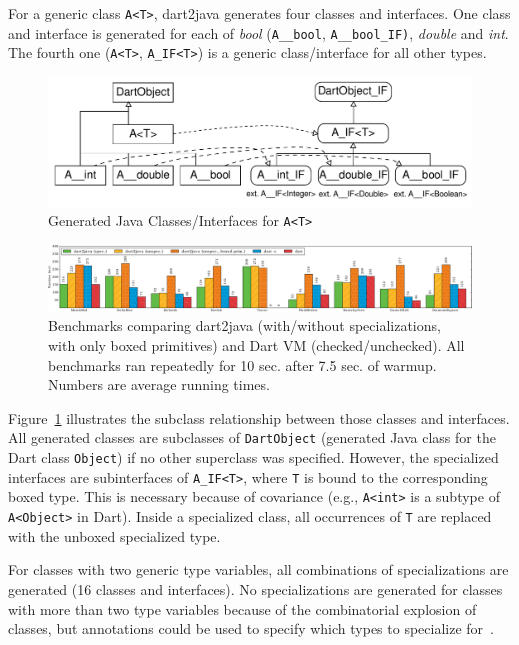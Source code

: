 \documentclass[sigplan]{acmart}
\begin{document}
For a generic class \texttt{A<T>}, dart2java generates four classes and interfaces. One class and interface is generated for each of \emph{bool} (\texttt{A\_\_bool}, \texttt{A\_\_bool\_IF)}, \emph{double} and \emph{int}. The fourth one (\texttt{A<T>},  \texttt{A\_IF<T>}) is a generic class/interface for all other types.

\begin{figure}[!htp]
	\includegraphics[width=\columnwidth]{generic_spec_classes.pdf}
    \caption{Generated Java Classes/Interfaces for \texttt{A<T>}}
    \label{fig:generic_spec_classes}
\end{figure}
\begin{figure}[!t]
\includegraphics[width=\textwidth]{benchmark_plot.pdf}
\caption{Benchmarks comparing dart2java (with/without specializations, with only boxed primitives) and Dart VM (checked/unchecked). All benchmarks ran repeatedly for 10 sec. after 7.5 sec. of warmup. Numbers are average running times.}
\label{fig:benchmarks}
\end{figure}

Figure~\ref{fig:generic_spec_classes} illustrates the subclass relationship between those classes and interfaces. All generated classes are subclasses of \texttt{DartObject} (generated Java class for the Dart class \texttt{Object}) if no other superclass was specified. However, the specialized interfaces are subinterfaces of \texttt{A\_IF<T>}, where \texttt{T} is bound to the corresponding boxed type. This is necessary because of covariance (e.g., \texttt{A<int>} is a subtype of \texttt{A<Object>} in Dart). Inside a specialized class, all occurrences of \texttt{T} are replaced with the unboxed specialized type.

For classes with two generic type variables, all combinations of specializations are generated (16 classes and interfaces). No specializations are generated for classes with more than two type variables because of the combinatorial explosion of classes, but annotations could be used to specify which types to specialize for~\cite{Dragos:2009:CGT:1565824.1565830}. 
\end{document}
